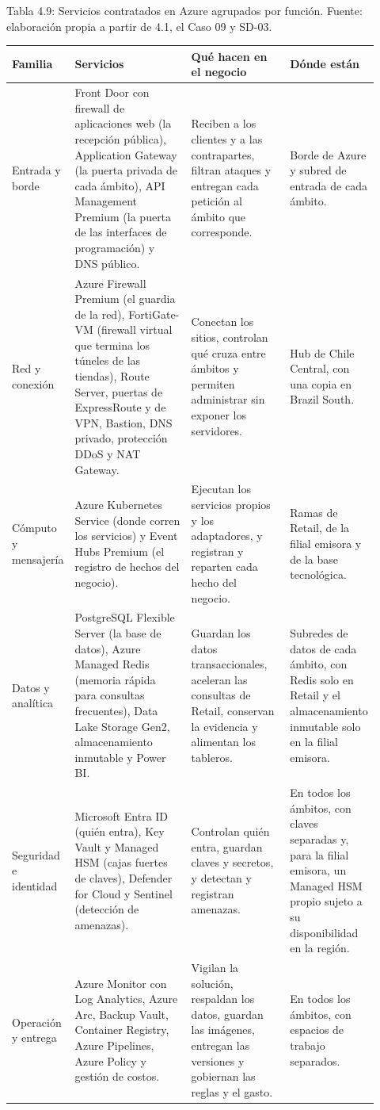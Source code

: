 \documentclass[11pt]{article}
\begin{document}
Tabla 4.9: Servicios contratados en Azure agrupados por función. Fuente: elaboración propia a partir de 4.1, el Caso 09 y SD-03.\par\nopagebreak
\begin{longtable}{@{}p{0.125\linewidth}p{0.327\linewidth}p{0.279\linewidth}p{0.192\linewidth}@{}}
\toprule Familia & Servicios & Qué hacen en el negocio & Dónde están \\
\midrule\endhead\bottomrule\endlastfoot
Entrada y borde & Front Door con firewall de aplicaciones web (la recepción pública), Application Gateway (la puerta privada de cada ámbito), API Management Premium (la puerta de las interfaces de programación) y DNS público. & Reciben a los clientes y a las contrapartes, filtran ataques y entregan cada petición al ámbito que corresponde. & Borde de Azure y subred de entrada de cada ámbito. \\
Red y conexión & Azure Firewall Premium (el guardia de la red), FortiGate-VM (firewall virtual que termina los túneles de las tiendas), Route Server, puertas de ExpressRoute y de VPN, Bastion, DNS privado, protección DDoS y NAT Gateway. & Conectan los sitios, controlan qué cruza entre ámbitos y permiten administrar sin exponer los servidores. & Hub de Chile Central, con una copia en Brazil South. \\
Cómputo y mensajería & Azure Kubernetes Service (donde corren los servicios) y Event Hubs Premium (el registro de hechos del negocio). & Ejecutan los servicios propios y los adaptadores, y registran y reparten cada hecho del negocio. & Ramas de Retail, de la filial emisora y de la base tecnológica. \\
Datos y analítica & PostgreSQL Flexible Server (la base de datos), Azure Managed Redis (memoria rápida para consultas frecuentes), Data Lake Storage Gen2, almacenamiento inmutable y Power BI. & Guardan los datos transaccionales, aceleran las consultas de Retail, conservan la evidencia y alimentan los tableros. & Subredes de datos de cada ámbito, con Redis solo en Retail y el almacenamiento inmutable solo en la filial emisora. \\
Seguridad e identidad & Microsoft Entra ID (quién entra), Key Vault y Managed HSM (cajas fuertes de claves), Defender for Cloud y Sentinel (detección de amenazas). & Controlan quién entra, guardan claves y secretos, y detectan y registran amenazas. & En todos los ámbitos, con claves separadas y, para la filial emisora, un Managed HSM propio sujeto a su disponibilidad en la región. \\
Operación y entrega & Azure Monitor con Log Analytics, Azure Arc, Backup Vault, Container Registry, Azure Pipelines, Azure Policy y gestión de costos. & Vigilan la solución, respaldan los datos, guardan las imágenes, entregan las versiones y gobiernan las reglas y el gasto. & En todos los ámbitos, con espacios de trabajo separados. \\
\end{longtable}
\end{document}
